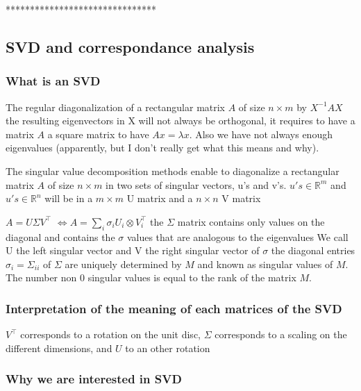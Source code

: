 \documentclass{article}
\begin{document}
*******************************









\subsection{SVD and correspondance analysis}

\subsubsection{What is an SVD}

The regular diagonalization of a rectangular matrix $A$ of size $n \times m$ by $X^{-1} AX$ the resulting eigenvectors in X will not always be orthogonal, it requires to have a matrix $A$ a square matrix to have $Ax = \lambda x$. Also we have not always enough eigenvalues (apparently, but I don't really get what this means and why).

The singular value decomposition methods enable to diagonalize a rectangular matrix $A$ of size $n \times m$ in two sets of singular vectors, u's and v's. 
$u's \in \mathbb{R}^m$ and $u's \in \mathbb{R}^n$ will be in a $m \times m$ U matrix and a $n \times n$ V matrix

$A = U \Sigma V^\intercal$
$\Leftrightarrow A = \sum_i \sigma_i U_i \otimes V_i^\intercal$
the  $\Sigma$ matrix contains only values on the diagonal and contains the $\sigma$ values that are analogous to the eigenvalues 
We call U the left singular vector and V the right singular vector of $\sigma$
the diagonal entries $\sigma_i = \Sigma_{ii}$ of $\Sigma$ are uniquely determined by $M$ and known as singular values of $M$. The number non 0 singular values is equal to the rank of the matrix $M$.

\subsubsection{Interpretation of the meaning of each matrices of the SVD}

$V^\intercal$ corresponds to a rotation on the unit disc, $\Sigma$ corresponds to a  scaling on the different dimensions, and $U$ to an other rotation 

\subsubsection{Why we are interested in SVD}
\end{document}
